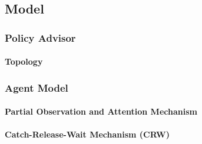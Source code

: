 \documentclass{article}
\begin{document}
	\subsection{Model}

	\subsubsection{Policy Advisor}

	\paragraph{Topology}



	\subsubsection{Agent Model}

	\paragraph{Partial Observation and Attention Mechanism}


	\paragraph{Catch-Release-Wait Mechanism (CRW)}
\end{document}
